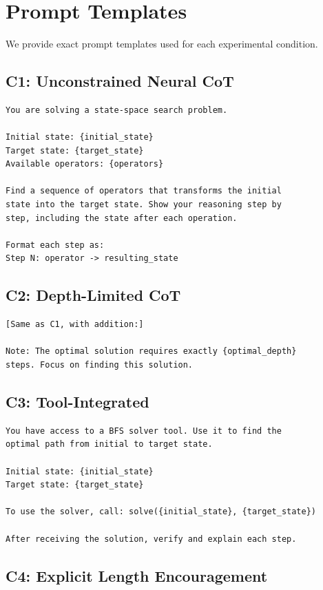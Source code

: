 \documentclass{article}
\theoremstyle{plain}
\theoremstyle{definition}
\theoremstyle{remark}
\begin{document}
\section{Prompt Templates}
\label{app:prompts}

We provide exact prompt templates used for each experimental condition.

\subsection{C1: Unconstrained Neural CoT}

\begin{verbatim}
You are solving a state-space search problem.

Initial state: {initial_state}
Target state: {target_state}
Available operators: {operators}

Find a sequence of operators that transforms the initial 
state into the target state. Show your reasoning step by 
step, including the state after each operation.

Format each step as:
Step N: operator -> resulting_state
\end{verbatim}

\subsection{C2: Depth-Limited CoT}

\begin{verbatim}
[Same as C1, with addition:]

Note: The optimal solution requires exactly {optimal_depth} 
steps. Focus on finding this solution.
\end{verbatim}

\subsection{C3: Tool-Integrated}

\begin{verbatim}
You have access to a BFS solver tool. Use it to find the 
optimal path from initial to target state.

Initial state: {initial_state}
Target state: {target_state}

To use the solver, call: solve({initial_state}, {target_state})

After receiving the solution, verify and explain each step.
\end{verbatim}

\subsection{C4: Explicit Length Encouragement}
\end{document}
